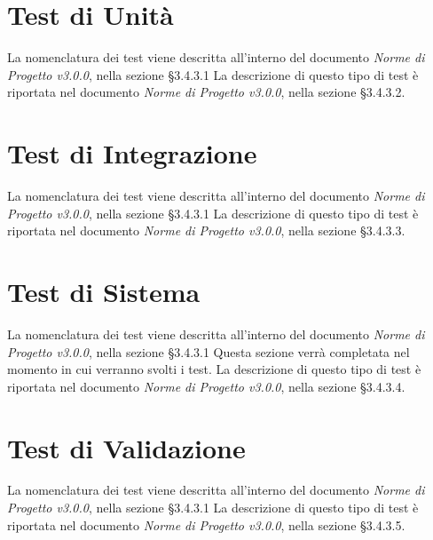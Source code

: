 \section{Test di Unità}
\label{test_u}

La nomenclatura dei test viene descritta all'interno del documento \textit{Norme di Progetto v3.0.0}, nella sezione §3.4.3.1 La descrizione di questo tipo di test è riportata nel documento \textit{Norme di Progetto v3.0.0}, nella sezione §3.4.3.2.




\newpage
\section{Test di Integrazione}
\label{test_i}
La nomenclatura dei test viene descritta all'interno del documento \textit{Norme di Progetto v3.0.0}, nella sezione §3.4.3.1 La descrizione di questo tipo di test è riportata nel documento \textit{Norme di Progetto v3.0.0}, nella sezione §3.4.3.3.



\newpage
\section{Test di Sistema}
\label{test_s}
La nomenclatura dei test viene descritta all'interno del documento \textit{Norme di Progetto v3.0.0}, nella sezione §3.4.3.1 Questa sezione verrà completata nel momento in cui verranno svolti i test. La descrizione di questo tipo di test è riportata nel documento \textit{Norme di Progetto v3.0.0}, nella sezione §3.4.3.4.




\newpage





\section{Test di Validazione}
\label{test_v}

La nomenclatura dei test viene descritta all'interno del documento \textit{Norme di Progetto v3.0.0}, nella sezione §3.4.3.1 La descrizione di questo tipo di test è riportata nel documento \textit{Norme di Progetto v3.0.0}, nella sezione §3.4.3.5.




